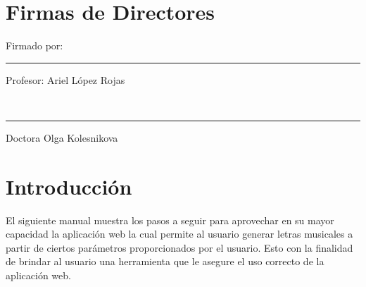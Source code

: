 \documentclass[12pt, a4paper, titlepage]{article}
\begin{document}
	\newpage
	\section*{Firmas de Directores}
	
	\vfill  %
	\noindent 
	\parbox[b]{0.4\linewidth}{%
		\strut 
		Firmado por: \\[3cm]%
		\hrule
		Profesor: Ariel López Rojas} 
	\hspace{1cm} %
	\parbox[b]{0.4\linewidth}{%
		\strut 
		\\[3cm]%
		\hrule
		Doctora Olga Kolesnikova} 
	\par\vspace{1cm} 
	\newpage
	\renewcommand\appendixpagename{Índice}
	\renewcommand\appendixtocname{Índice}
	\appendixpageoff
	\begin{appendices}
		\renewcommand*\contentsname{{\textcolor{azulescom}{Índice.}}}
		\tableofcontents
		\newpage
		\renewcommand*\listfigurename{{\textcolor{azulescom}{Índice de figuras.}}}
		\listoffigures
		\newpage
		\newpage
	\end{appendices}
	
	\section{Introducción}
	El siguiente manual muestra los pasos a seguir para aprovechar en su mayor capacidad la aplicación web la cual permite al usuario generar letras musicales a partir de ciertos parámetros proporcionados por el usuario. Esto con la finalidad de brindar al usuario una herramienta que le asegure el uso correcto de la aplicación web.
	
\end{document}
